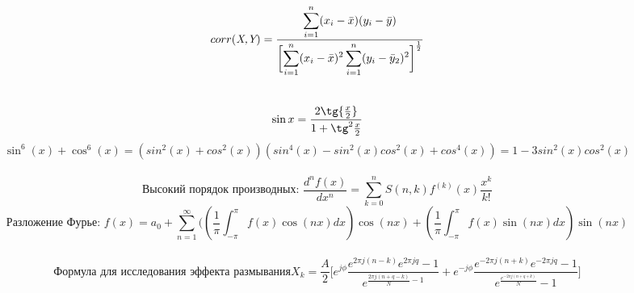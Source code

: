 \thispagestyle{fancy}
\fancyhead{} 
\begin{center}
\[corr(\emph{X,Y})=\frac{\displaystyle\sum_{i=1}^{n}(x_i-\bar x)(y_i-\bar y)}{\biggl[\displaystyle\sum_{i=1}^{n}(x_i-\bar x)^2\displaystyle\sum_{i=1}^{n}(y_i- \bar y_2)^2\biggr]^\frac{1}{2}}\]\\
\[
\sin{x} = \frac{2\tg{\frac{x}{2}}}{1+\tg^2{\frac{x}{2}}}
\]
\[\sin^6(x) + \cos^6(x)=(sin^2(x)+cos^2(x))(sin^4(x)-sin^2(x)cos^2(x)+cos^4(x))=1-3sin^2(x)cos^2(x)\]\\
\[\text{Высокий порядок производных: }
\frac{d^nf(x)}{dx^n}=\displaystyle\sum_{k=0}^nS(n,k)f^{(k)}(x)\frac{x^k}{k!}
\]
\[\text{Разложение Фурье: }
f(x)=a_0 + \displaystyle\sum_{n=1}^{\infty}((\frac{1}{\pi}\int_{-\pi}^{\pi}f(x)\cos{(nx)}dx)\cos{(nx)}+(\frac{1}{\pi}\int_{-\pi}^{\pi}f(x)\sin{(nx)}dx)\sin{(nx)}
\]\\
\[\text{Формула для исследования эффекта размывания}X_k = \frac{A}{2}\biggl[ e^{j\phi}\frac{e^{2\pi j(n-k)}e^{2\pi jq}-1}{e^{\frac{2\pi j(n+q-k)}{N}-1}}+e^{-j\phi}\frac{e^{-2\pi j(n+k)}e^{-2\pi jq}-1}{e^{\frac{e^{-2\pi j(n+q+k)}}{N}}-1}\biggr]
\]
\end{center}
